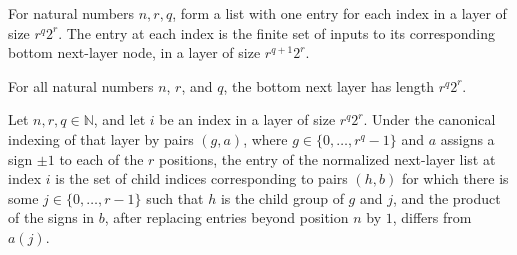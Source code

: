 \begin{definition}
\label{FABL.parityBottomNextLayer}
\leanok
{}
For natural numbers $n,r,q$, form a list with one entry for each index in a layer of
size $r^q2^r$. The entry at each index is the finite set of inputs to its corresponding
bottom next-layer node, in a layer of size $r^{q+1}2^r$.
\end{definition}

\begin{theorem}
\label{FABL.length_parityBottomNextLayer}
\leanok
{}
For all natural numbers $n$, $r$, and $q$, the bottom next layer has length $r^q 2^r$.
\end{theorem}

\begin{theorem}
\label{FABL.get_parityBottomNextLayer}
\leanok
{}
Let $n,r,q\in\mathbb N$, and let $i$ be an index in a layer of size $r^q2^r$. Under the
canonical indexing of that layer by pairs $(g,a)$, where $g\in\{0,\ldots,r^q-1\}$ and
$a$ assigns a sign $\pm1$ to each of the $r$ positions, the entry of the normalized
next-layer list at index $i$ is the set of child indices corresponding to pairs $(h,b)$
for which there is some $j\in\{0,\ldots,r-1\}$ such that $h$ is the child group of $g$
and $j$, and the product of the signs in $b$, after replacing entries beyond position
$n$ by $1$, differs from $a(j)$.
\end{theorem}

